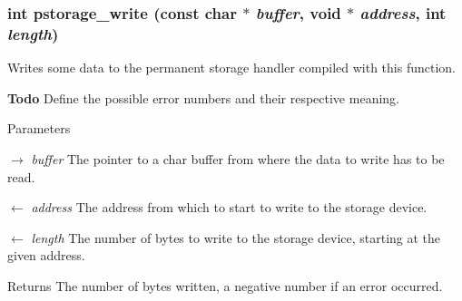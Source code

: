 \subsubsection[{pstorage\_\-write}]{\setlength{\rightskip}{0pt plus 5cm}int pstorage\_\-write (const char $\ast$ {\em buffer}, \/  void $\ast$ {\em address}, \/  int {\em length})}\label{de/de8/persistent_8h_aac8f890e18a7efc92da006f99bd27da0}
Writes some data to the permanent storage handler compiled with this function.

\begin{Desc}
\item[{\bf Todo}]Define the possible error numbers and their respective meaning.\end{Desc}

\begin{DoxyParams}{Parameters}
\item[\mbox{$\rightarrow$} {\em buffer}]The pointer to a char buffer from where the data to write has to be read. \item[\mbox{$\leftarrow$} {\em address}]The address from which to start to write to the storage device. \item[\mbox{$\leftarrow$} {\em length}]The number of bytes to write to the storage device, starting at the given address.\end{DoxyParams}
\begin{DoxyReturn}{Returns}
The number of bytes written, a negative number if an error occurred. 
\end{DoxyReturn}
